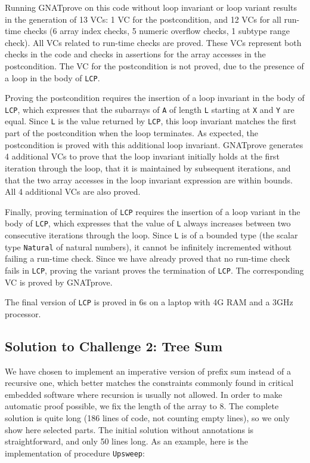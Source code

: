 \documentclass[sttt,final]{svjour}
\newcommand{\gnatprove}{GNATprove\xspace}
\begin{document}
Running \gnatprove on this code without loop invariant or loop variant results
in the generation of 13 VCs: 1 VC for the postcondition, and 12 VCs for all
run-time checks (6 array index checks, 5 numeric overflow checks, 1 subtype
range check). All VCs related to run-time checks are proved. These VCs
represent both checks in the code and checks in assertions for the array
accesses in the postcondition. The VC for the postcondition is not proved, due
to the presence of a loop in the body of \verb|LCP|.

Proving the postcondition requires the insertion of a loop invariant in the
body of \verb|LCP|, which expresses that the subarrays of \verb|A| of length
\verb|L| starting at \verb|X| and \verb|Y| are equal. Since \verb|L| is the
value returned by \verb|LCP|, this loop invariant matches the first part of the
postcondition when the loop terminates. As expected, the postcondition is
proved with this additional loop invariant. \gnatprove generates 4 additional
VCs to prove that the loop invariant initially holds at the first iteration
through the loop, that it is maintained by subsequent iterations, and that the
two array accesses in the loop invariant expression are within bounds. All 4
additional VCs are also proved.

Finally, proving termination of \verb|LCP| requires the insertion of a loop
variant in the body of \verb|LCP|, which expresses that the value of \verb|L|
always increases between two consecutive iterations through the loop. Since
\verb|L| is of a bounded type (the scalar type \verb|Natural| of natural
numbers), it cannot be infinitely incremented without failing a run-time
check. Since we have already proved that no run-time check fails in \verb|LCP|,
proving the variant proves the termination of \verb|LCP|. The corresponding VC
is proved by \gnatprove.

The final version of \verb|LCP| is proved in 6s on a laptop with 4G
RAM and a 3GHz processor.

\subsection{Solution to Challenge 2: Tree Sum}

We have chosen to implement an imperative version of prefix sum
instead of a recursive one, which better matches the constraints
commonly found in critical embedded software where recursion is
usually not allowed. In order to make automatic proof possible, we fix
the length of the array to 8. The complete solution is quite long (186
lines of code, not counting empty lines), so we only show here
selected parts. The initial solution without annotations is
straightforward, and only 50 lines long. As an example, here is the
implementation of procedure \verb|Upsweep|:
\end{document}
